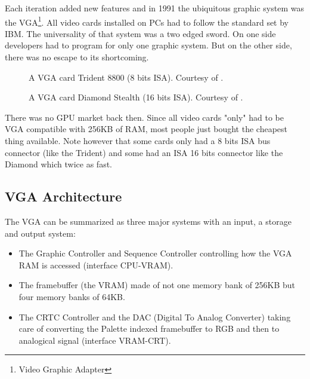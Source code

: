 \documentclass[book.tex]{subfiles}
\begin{document}
Each iteration added new features and in 1991 the ubiquitous graphic system was the VGA\footnote{Video Graphic Adapter}. All video cards installed on PCs had to follow the standard set by IBM. The universality of that system was a two edged sword. On one side developers had to program for only one graphic system. But on the other side, there was no escape to its shortcoming.\\

\begin{figure}[H] 
  \centering 
  \caption{A VGA card Trident 8800 (8 bits ISA). Courtesy of .}
\end{figure}
\par
\begin{figure}[H] 
  \centering 
  \caption{A VGA card Diamond Stealth (16 bits ISA). Courtesy of .}
\end{figure}
 There was no GPU market back then. Since all video cards "only" had to be VGA compatible with 256KB of RAM, most people just bought the cheapest thing available. Note however that some cards only had a 8 bits ISA bus connector (like the Trident) and some had an ISA 16 bits connector like the Diamond which twice as fast.\\
\par




\subsection{VGA Architecture}

The VGA can be summarized as three major systems with an input, a storage and output system:\\

\begin{itemize}
\item The Graphic Controller and Sequence Controller controlling how the VGA RAM is accessed (interface CPU-VRAM).
\item The framebuffer (the VRAM) made of not one memory bank of 256KB but four memory banks of 64KB.
\item The CRTC Controller and the DAC (Digital To Analog Converter) taking care of converting the Palette indexed framebuffer to RGB and then to analogical signal (interface VRAM-CRT).
\end{itemize}
\end{document}
